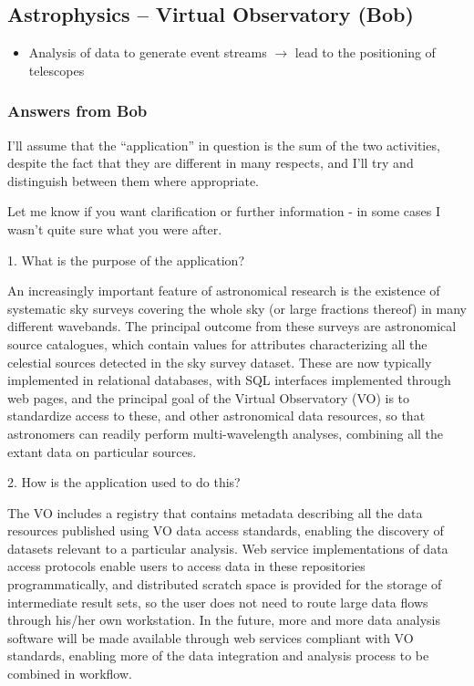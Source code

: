 \documentclass[preprint,12pt]{article}
\begin{document}
\subsection{Astrophysics -- Virtual Observatory (Bob) \label{astroBob}}
\begin{itemize}
\item Analysis of data to generate event streams $\rightarrow$ lead to the
  positioning of telescopes
\end{itemize}

\subsubsection{Answers from Bob}

I'll assume that the ``application'' in question is the sum of the two
activities, despite the fact that they are different in many respects,
and I'll try and distinguish between them where appropriate.

Let me know if you want clarification or further information - in some cases I wasn't quite sure what you were after.

1. What is the purpose of the application?

An increasingly important feature of astronomical research is the existence of
systematic sky surveys covering the whole sky (or large fractions thereof) in
many different wavebands. The principal outcome from these surveys are
astronomical source catalogues, which contain values for attributes
characterizing all the celestial sources detected in the sky survey dataset.
These are now typically implemented in relational databases, with SQL interfaces
implemented through web pages, and the principal goal of the Virtual Observatory
(VO) is to standardize access to these, and other astronomical data resources,
so that astronomers can readily perform multi-wavelength analyses, combining all
the extant data on particular sources.

      2. How is the application used to do this?

The VO includes a registry that contains metadata describing all the data
resources published using VO data access standards, enabling the discovery of
datasets relevant to a particular analysis. Web service implementations of data
access protocols enable users to access data in these repositories
programmatically, and distributed scratch space is provided for the storage of
intermediate result sets, so the user does not need to route large data flows
through his/her own workstation. In the future, more and more data analysis
software will be made available through web services compliant with VO
standards, enabling more of the data integration and analysis process to be
combined in workflow.
\end{document}
